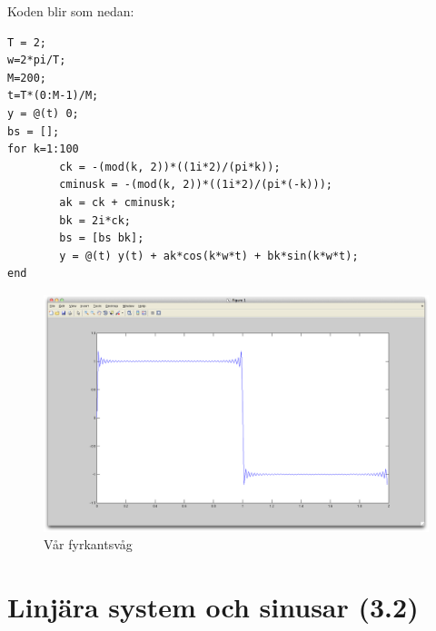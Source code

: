 \documentclass[]{article}
\begin{document}
Koden blir som nedan:

\begin{verbatim}
T = 2;
w=2*pi/T;
M=200;
t=T*(0:M-1)/M;
y = @(t) 0;
bs = [];
for k=1:100
		ck = -(mod(k, 2))*((1i*2)/(pi*k));
		cminusk = -(mod(k, 2))*((1i*2)/(pi*(-k)));
		ak = ck + cminusk;
		bk = 2i*ck;
		bs = [bs bk];
		y = @(t) y(t) + ak*cos(k*w*t) + bk*sin(k*w*t);
end
\end{verbatim}
\begin{figure}[htb]
  \centering
  \includegraphics[width=15.0cm]{square.png}
  \caption{Vår fyrkantsvåg}
\end{figure}

\section{Linjära system och sinusar (3.2)} %
\end{document}
